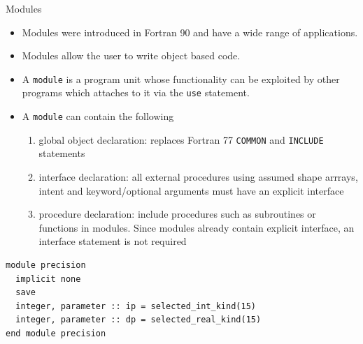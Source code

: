 \documentclass[c,mathserif,compress,xcolor=svgnames]{beamer}
\newcommand{\lstfortran}[1]{\lstinline[language={[90]Fortran},basicstyle=\footnotesize\ttfamily]|#1|}
\begin{document}
\begin{frame}{Modules}
  \begin{itemize}
    \item Modules were introduced in Fortran 90 and have a wide range of applications.
    \item Modules allow the user to write object based code.
    \item A \lstfortran{module} is a program unit whose functionality can be exploited by other programs which attaches to it via the \lstfortran{use} statement.
    \item A \lstfortran{module} can contain the following
    \begin{enumerate}
      \item global object declaration: replaces Fortran 77 \lstfortran{COMMON} and \lstfortran{INCLUDE} statements
      \item interface declaration: all external procedures using assumed shape arrrays, intent and keyword/optional arguments must have an explicit interface
      \item procedure declaration: include procedures such as subroutines or functions in modules. Since modules already contain explicit interface, an interface statement is not required
    \end{enumerate}
  \end{itemize}
  \framebreak
  \begin{lstlisting}[language={[90]Fortran},basicstyle=\fontsize{4}{5}\selectfont\ttfamily,multicols=2]
module precision
  implicit none
  save
  integer, parameter :: ip = selected_int_kind(15)
  integer, parameter :: dp = selected_real_kind(15)
end module precision


\end{lstlisting}
\end{frame}
\end{document}
